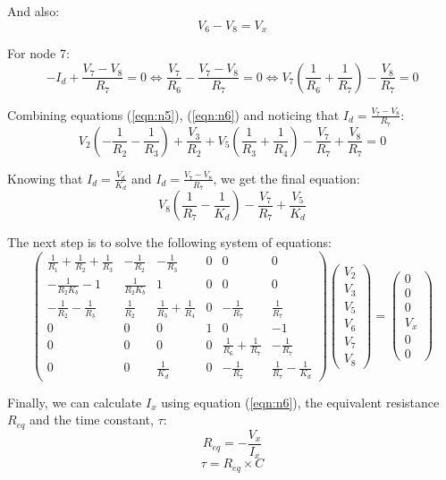 And also:
\begin{equation}
V_6-V_8 = V_x
\end{equation}

For node 7:
\begin{equation}
-I_d + \frac{V_7-V_8}{R_7} = 0 \Leftrightarrow \frac{V_7}{R_6} - \frac{V_7-V_8}{R_7} = 0\Leftrightarrow V_7\left(\frac{1}{R_6} + \frac{1}{R_7}\right) - \frac{V_8}{R_7} = 0
\end{equation}

Combining equations (\eqref{eqn:n5}), (\eqref{eqn:n6}) and noticing that $I_d = \frac{V_7-V_8}{R_7}$:
\begin{equation}
V_2 \left( -\frac{1}{R_2} - \frac{1}{R_3}\right) + \frac{V_3}{R_2} +  V_5 \left( \frac{1}{R_3} + \frac{1}{R_4}\right) - \frac{V_7}{R_7} + \frac{V_8}{R_7} = 0
\end{equation}

Knowing that $I_d = \frac{V_d}{K_d}$ and $I_d = \frac{V_7-V_8}{R_7}$, we get the final equation:
\begin{equation}
V_8\left( \frac{1}{R_7} - \frac{1}{K_d}\right) - \frac{V_7}{R_7} + \frac{V_5}{K_d}
\end{equation}


The next step is to solve the following system of equations:
\begin{equation}
\left(\begin{array}{cccccc} \frac{1}{R_1}+\frac{1}{R_2} +\frac{1}{R_3} & -\frac{1}{R_2} & -\frac{1}{R_3} & 0 & 0 & 0\\ -\frac{1}{R_2 K_b}-1 & \frac{1}{R_2 K_b} & 1 & 0 & 0 & 0 \\ -\frac{1}{R_2}-\frac{1}{R_3} & \frac{1}{R_2} & \frac{1}{R_3}+\frac{1}{R_4} & 0& -\frac{1}{R_7} &\frac{1}{R_7} \\ 0&0&0&1&0&-1\\0&0&0&0&\frac{1}{R_6}+\frac{1}{R_7}&-\frac{1}{R_7} \\ 0&0&\frac{1}{K_d}&0&-\frac{1}{R_7}&\frac{1}{R_7}-\frac{1}{K_d}\end{array}\right)
\left(\begin{array}{c} V_2 \\ V_3 \\ V_5 \\ V_6 \\ V_7 \\ V_8 \end{array}\right) 
= \left(\begin{array}{c} 0 \\ 0 \\ 0 \\ V_x \\ 0 \\ 0 \end{array}\right)
\end{equation}

Finally, we can calculate $I_x$ using equation (\eqref{eqn:n6}), the equivalent resistance $R_{eq}$ and the time constant, $\tau$: 
\begin{equation}
R_{eq}=-\frac{V_x}{I_x}
\end{equation}
\begin{equation}
\tau=R_{eq}\times C
\end{equation}
